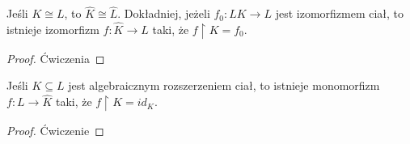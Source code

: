 \begin{conclusion}\label{wniosek:5:10}
    Jeśli $K\cong L$, to $\hat{K}\cong \hat{L}$. Dokładniej, jeżeli $f_0:LK\to L$ jest izomorfizmem ciał, to istnieje izomorfizm $f:\hat{K}\to\hat{L}$ taki, że $f\restriction K=f_0$.
\end{conclusion}
\begin{proof}
Ćwiczenia
\end{proof}

\begin{remark}
    Jeśli $K\subseteq L$ jest algebraicznym rozszerzeniem ciał, to istnieje monomorfizm $f:L\to \hat{K}$ taki, że $f\restriction K=id_K$.
\end{remark}

\begin{proof}
Ćwiczenie
\end{proof}

